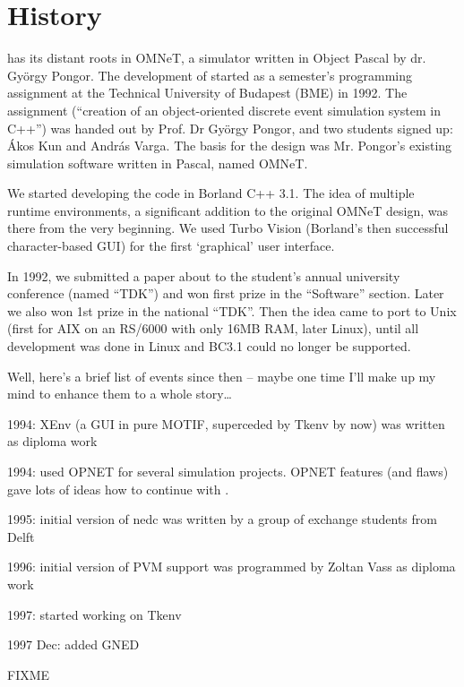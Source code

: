 \section{History}


{\opp} has its distant roots in OMNeT, a simulator written
in Object Pascal by dr. Gy\"{o}rgy Pongor.
The development of {\opp} started as a semester's programming
assignment at the Technical University of Budapest (BME) in 1992.
The assignment (``creation of an object-oriented discrete event
simulation system in C++'') was handed out by Prof. Dr Gy\"{o}rgy
Pongor, and two students signed up: \'{A}kos Kun and Andr\'{a}s Varga.
The basis for the design was Mr. Pongor's existing simulation
software written in Pascal, named OMNeT.

We started developing the code in Borland C++ 3.1. The idea
of multiple runtime environments, a significant addition to the
original OMNeT design, was there from the very beginning.
We used Turbo Vision (Borland's then successful character-based
GUI) for the first `graphical' user interface.

In 1992, we submitted a paper about {\opp} to the
student's annual university conference
(named ``TDK'') and won first prize in the ``Software'' section.
Later we also won 1st prize in the national ``TDK''. Then the
idea came to port {\opp} to Unix (first for AIX on an RS/6000
with only 16MB RAM, later Linux), until all development was done
in Linux and BC3.1 could no longer be supported.

Well, here's a brief list of events since then -- maybe one time
I'll make up my mind to enhance them to a whole story\dots

1994: XEnv (a GUI in pure MOTIF, superceded by Tkenv by now)
was written as diploma work

1994: used OPNET for several simulation projects. OPNET features
(and flaws) gave lots of ideas how to continue with {\opp}.

1995: initial version of nedc was written by a group of exchange
students from Delft

1996: initial version of PVM support was programmed by Zoltan
Vass as diploma work

1997: started working on Tkenv

1997 Dec: added GNED

FIXME



